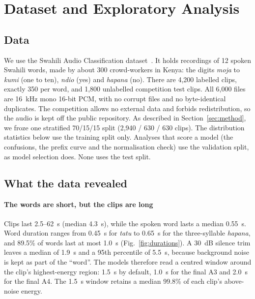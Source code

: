 \section{Dataset and Exploratory Analysis}
\label{sec:data}

\subsection{Data}
We use the Swahili Audio Classification dataset~\cite{zindi2021swahili}. It holds recordings of 12 spoken Swahili
words, made by about 300 crowd-workers in Kenya: the digits \textit{moja} to \textit{kumi} (one to ten),
\textit{ndio} (yes) and \textit{hapana} (no). There are 4{,}200 labelled clips, exactly 350 per word, and
1{,}800 unlabelled competition test clips. All 6{,}000 files are 16~kHz mono 16-bit PCM, with no corrupt files
and no byte-identical duplicates. The competition allows no external data and forbids redistribution, so the audio
is kept off the public repository. As described in Section~\ref{sec:method}, we froze one stratified 70/15/15
split (2{,}940 / 630 / 630 clips). The distribution statistics below use the training split only. Analyses that
score a model (the confusions, the prefix curve and the normalisation check) use the validation split, as model
selection does. None uses the test split.

\subsection{What the data revealed}
\paragraph{The words are short, but the clips are long}
Clips last 2.5--62~s (median 4.3~s), while the spoken word lasts a median 0.55~s. Word duration ranges from
0.45~s for \textit{tatu} to 0.65~s for the three-syllable \textit{hapana}, and 89.5\% of words last at most 1.0~s
(Fig.~\ref{fig:durations}). A 30~dB silence trim leaves a median of 1.9~s and a 95th percentile of 5.5~s,
because background noise is kept as part of the ``word''. The models therefore read a centred window around the
clip's highest-energy region: 1.5~s by default, 1.0~s for the final A3 and 2.0~s for the final A4. The 1.5~s window
retains a median 99.8\% of each clip's above-noise energy.

